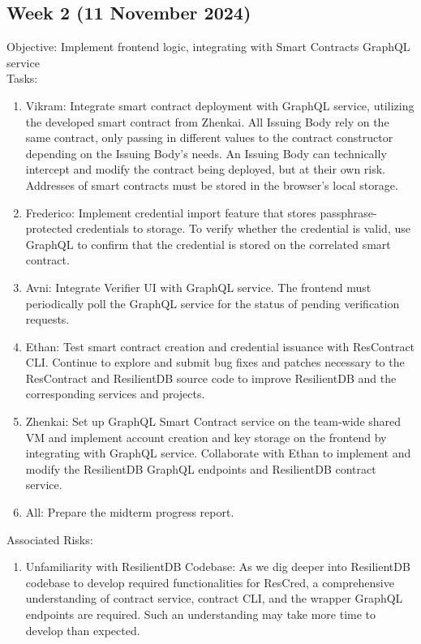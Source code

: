 \subsection{Week 2 (11 November 2024)}
Objective: Implement frontend logic, integrating with Smart Contracts GraphQL service \\
Tasks: 
\begin{enumerate}
    \item Vikram: Integrate smart contract deployment with GraphQL service, utilizing the developed smart contract from Zhenkai. All Issuing Body rely on the same contract, only passing in different values to the contract constructor depending on the Issuing Body’s needs. An Issuing Body can technically intercept and modify the contract being deployed, but at their own risk. Addresses of smart contracts must be stored in the browser's local storage.
    \item Frederico: Implement credential import feature that stores passphrase-protected credentials to storage. To verify whether the credential is valid, use GraphQL to confirm that the credential is stored on the correlated smart contract.
    \item Avni: Integrate Verifier UI with GraphQL service. The frontend must periodically poll the GraphQL service for the status of pending verification requests.
    \item Ethan: Test smart contract creation and credential issuance with ResContract CLI.
        Continue to explore and submit bug fixes and patches necessary to the ResContract and
        ResilientDB source code to improve ResilientDB and the corresponding services and projects.
    \item Zhenkai: Set up GraphQL Smart Contract service on the team-wide shared VM and implement
        account creation and key storage on the frontend by integrating with GraphQL service. 
        Collaborate with Ethan to implement and modify the ResilientDB GraphQL endpoints and ResilientDB contract service.
    \item All: Prepare the midterm progress report.
\end{enumerate}
Associated Risks:
\begin{enumerate}
    \item Unfamiliarity with ResilientDB Codebase: As we dig deeper into ResilientDB codebase to develop required functionalities for ResCred, a comprehensive understanding of contract service, contract CLI, and the wrapper GraphQL endpoints are required. Such an understanding may take more time to develop than expected. 
\end{enumerate}

